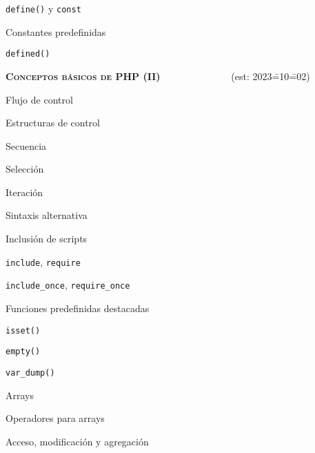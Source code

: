 \begin{longenum}
\begin{longenum}
        \begin{longenum}
            \item \texttt{define()} y \texttt{const}
            \item Constantes predefinidas
            \item \texttt{defined()}
        \end{longenum}
    \end{longenum}
    \item \textbf{\textsc{Conceptos básicos de PHP (II)}} \ \ \ \ \ \ \ \ \ \ \ \ \ \ (est: 2023\==10\==02)
    \begin{longenum}
        \item Flujo de control
        \begin{longenum}
            \item Estructuras de control
            \begin{longenum}
                \item Secuencia
                \item Selección
                \item Iteración
                \item Sintaxis alternativa
            \end{longenum}
            \item Inclusión de scripts
            \begin{longenum}
                \item \texttt{include}, \texttt{require}
                \item \texttt{include\_once}, \texttt{require\_once}
            \end{longenum}
        \end{longenum}
        \item Funciones predefinidas destacadas
        \begin{longenum}
            \item \texttt{isset()}
            \item \texttt{empty()}
            \item \texttt{var\_dump()}
        \end{longenum}
        \item Arrays
        \begin{longenum}
            \item Operadores para arrays
            \begin{longenum}
                \item Acceso, modificación y agregación

\end{longenum}
\end{longenum}
\end{longenum}
\end{longenum}
